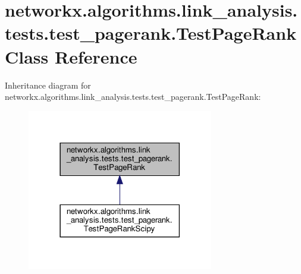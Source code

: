 \hypertarget{classnetworkx_1_1algorithms_1_1link__analysis_1_1tests_1_1test__pagerank_1_1TestPageRank}{}\section{networkx.\+algorithms.\+link\+\_\+analysis.\+tests.\+test\+\_\+pagerank.\+Test\+Page\+Rank Class Reference}
\label{classnetworkx_1_1algorithms_1_1link__analysis_1_1tests_1_1test__pagerank_1_1TestPageRank}


Inheritance diagram for networkx.\+algorithms.\+link\+\_\+analysis.\+tests.\+test\+\_\+pagerank.\+Test\+Page\+Rank\+:
\nopagebreak
\begin{figure}[H]
\begin{center}
\leavevmode
\includegraphics[width=230pt]{classnetworkx_1_1algorithms_1_1link__analysis_1_1tests_1_1test__pagerank_1_1TestPageRank__inherit__graph}
\end{center}
\end{figure}
